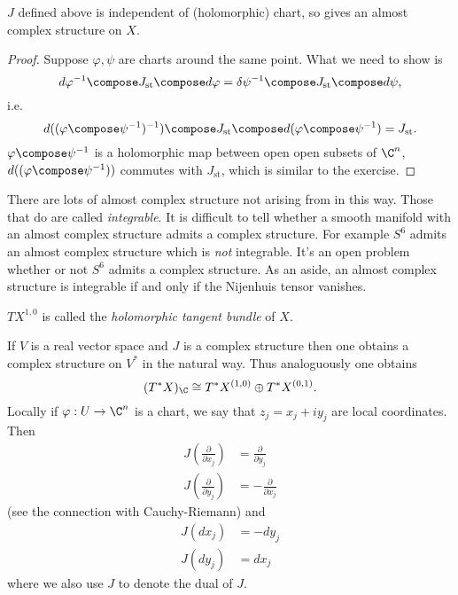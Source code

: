 \documentclass[a4paper]{article}
\begin{document}
\begin{proposition}
  \(J\) defined above is independent of (holomorphic) chart, so gives an almost complex structure on \(X\).
\end{proposition}

\begin{proof}
  Suppose \(\varphi, \psi\) are charts around the same point. What we need to show is
  \[
    d\varphi^{-1} \compose J_{\text{st}} \compose d\varphi = \delta\psi^{-1} \compose J_{\text{st}} \compose d \psi,
  \]
  i.e.
  \[
    d((\varphi \compose \psi^{-1})^{-1}) \compose J_{\text{st}} \compose d(\varphi \compose \psi^{-1}) = J_{\text{st}}.
  \]
  \(\varphi \compose \psi^{-1}\) is a holomorphic map between open open subsets of \(\C^n\), \(d((\varphi \compose \psi^{-1}))\) commutes with \(J_{\text{st}}\), which is similar to the exercise.
\end{proof}

\begin{remark}
  There are lots of almost complex structure not arising from in this way. Those that do are called \emph{integrable}. It is difficult to tell whether a smooth manifold with an almost complex structure admits a complex structure. For example \(S^6\) admits an almost complex structure which is \emph{not} integrable. It's an open problem whether or not \(S^6\) admits a complex structure. As an aside, an almost complex structure is integrable if and only if the Nijenhuis tensor vanishes.
\end{remark}

\begin{definition}
  \(TX^{1, 0}\) is called the \emph{holomorphic tangent bundle} of \(X\).
\end{definition}

If \(V\) is a real vector space and \(J\) is a complex structure then one obtains a complex structure on \(V^*\) in the natural way. Thus analoguously one obtains
\[
  (T^*X)_\C \cong T^*X^{(1, 0)} \oplus T^*X^{(0, 1)}.
\]
Locally if \(\varphi: U \to \C^n\) is a chart, we say that \(z_j = x_j + iy_j\) are local coordinates. Then
\begin{align*}
  J(\frac{\partial  }{\partial x_j}) &= \frac{\partial  }{\partial y_j} \\
  J(\frac{\partial  }{\partial y_j}) &= - \frac{\partial  }{\partial x_j}
\end{align*}
(see the connection with Cauchy-Riemann) and
\begin{align*}
  J(dx_j) &= -dy_j \\
  J(dy_j) &= dx_j
\end{align*}
where we also use \(J\) to denote the dual of \(J\).
\end{document}
